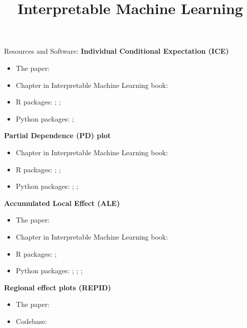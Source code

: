 \documentclass[10pt,compress,t,notes=noshow, xcolor=table]{beamer}
\title{Interpretable Machine Learning}
\date{}
\begin{document}


\begin{frame}{Resources and Software:}
\textbf{Individual Conditional Expectation (ICE)}
\begin{itemize}
    \item The paper: 
    \item Chapter in Interpretable Machine Learning book: 
    \item R packages: ; ; 
    \item Python packages: ; 
\end{itemize}

\medskip

\textbf{Partial Dependence (PD) plot}
\begin{itemize}
    \item Chapter in Interpretable Machine Learning book: 
    \item R packages: ; ; 
    \item Python packages: ; ; 
\end{itemize}

\textbf{Accumulated Local Effect (ALE)}
\begin{itemize}
    \item The paper: 
    \item Chapter in Interpretable Machine Learning book: 
    \item R packages: ; 
    \item Python packages: ; ; ; 
\end{itemize}

\textbf{Regional effect plots (REPID)}
\begin{itemize}
    \item The paper: 
    \item Codebase: 
\end{itemize}
\end{frame}


\endlecture
\end{document}
